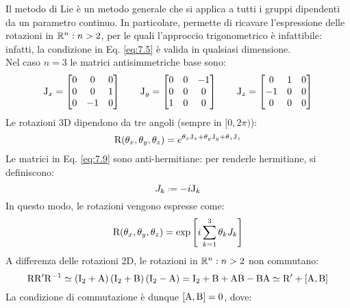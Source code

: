 Il metodo di Lie è un metodo generale che si applica a tutti i gruppi dipendenti da un parametro continuo. In particolare, permette di ricavare l'espressione delle rotazioni in $ \mathbb{R}^n : n > 2 $, per le quali l'approccio trigonometrico è infattibile: infatti, la condizione in Eq. \ref{eq:7.5} è valida in qualsiasi dimensione.\\
Nel caso $ n = 3 $ le matrici antisimmetriche base sono:
\begin{equation}
	\mathrm{J}_x =
	\begin{bmatrix}
		0 & 0 & 0 \\
		0 & 0 & 1 \\
		0 & -1 & 0
	\end{bmatrix}
	\qquad \mathrm{J}_y =
	\begin{bmatrix}
		0 & 0 & -1 \\
		0 & 0 & 0 \\
		1 & 0 & 0
	\end{bmatrix}
	\qquad \mathrm{J}_z =
	\begin{bmatrix}
		0 & 1 & 0 \\
		-1 & 0 & 0 \\
		0 & 0 & 0
	\end{bmatrix}
	\label{eq:7.9}
\end{equation}
Le rotazioni 3D dipendono da tre angoli (sempre in $ [0,2\pi) $):
\begin{equation}
	\mathrm{R}(\theta_x,\theta_y,\theta_z) = e^{\theta_x \mathrm{J}_x + \theta_y \mathrm{J}_y + \theta_z \mathrm{J}_z}
	\label{eq:7.10}
\end{equation}
Le matrici in Eq. \ref{eq:7.9} sono anti-hermitiane: per renderle hermitiane, si definiscono:
\begin{equation}
	J_k \defeq -i \tens{J}_k
	\label{eq:7.11}
\end{equation}
In questo modo, le rotazioni vengono espresse come:
\begin{equation}
	\mathrm{R}(\theta_x,\theta_y,\theta_z) = \exp \left[ i \sum_{k = 1}^{3} \theta_k J_k \right]
	\label{eq:7.12}
\end{equation}
A differenza delle rotazioni 2D, le rotazioni in $ \mathbb{R}^n : n > 2 $ non commutano:
\begin{equation}
	\mathrm{R}\mathrm{R}'\mathrm{R}^{-1} \simeq \left( \mathrm{I}_2 + \mathrm{A} \right) \left( \mathrm{I}_2 + \mathrm{B} \right) \left( \mathrm{I}_2 - \mathrm{A} \right) = \mathrm{I}_2 + \mathrm{B} + \mathrm{A}\mathrm{B} - \mathrm{B}\mathrm{A} \simeq \mathrm{R}' + \left[ \mathrm{A},\mathrm{B} \right]
\end{equation}
La condizione di commutazione è dunque $ [\mathrm{A},\mathrm{B}] = 0 $, dove:
